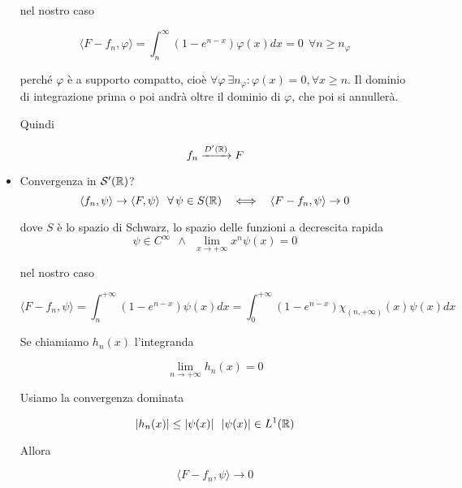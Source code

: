 \begin{itemize}
nel nostro caso

\begin{equation*}
\langle F - f_{n}, \varphi \rangle = \int^{\infty}_{n}\left(1 - e^{n - x}\right) \varphi (x)dx = 0\ \ \forall n \geq n_{\varphi}
\end{equation*}

perché $\varphi $ è a supporto compatto, cioè $\forall \varphi \ \exists n_{\varphi} :\varphi (x) = 0, \forall x \geq n$. Il dominio di integrazione prima o poi andrà oltre il dominio di $\varphi $, che poi si annullerà.

Quindi

\begin{equation*}
f_{n}\xrightarrow{D'(\mathbb{R})} F
\end{equation*}
\item Convergenza in $\mathcal{S}  '(\mathbb{R})$?
\begin{equation*}
\langle f_{n}, \psi \rangle \rightarrow \langle F, \psi \rangle \ \ \forall \psi \in S(\RR) \ \ \iff \ \ \langle F - f_{n}, \psi \rangle \rightarrow 0
\end{equation*}

dove $S$ è lo spazio di Schwarz, lo spazio delle funzioni a decrescita rapida
\begin{equation*}
\psi \in C^{\infty} \ \ \land \ \ \lim\limits_{x\rightarrow + \infty} x^{n} \psi (x) = 0
\end{equation*}

nel nostro caso

\begin{equation*}
\langle F - f_{n}, \psi \rangle = \int^{+ \infty}_{n}\left(1 - e^{n - x}\right) \psi (x) dx = \int^{+ \infty}_{0}\left(1 - e^{n - x}\right) \chi_{(n, + \infty)}(x) \psi (x) dx
\end{equation*}

Se chiamiamo $h_{n}(x)$ l'integranda

\begin{equation*}
\lim\limits_{n\rightarrow + \infty} h_{n}(x) = 0
\end{equation*}

Usiamo la convergenza dominata

\begin{equation*}
| h_{n}(x)| \leq | \psi (x)| \ \ | \psi (x)| \in L^{1}(\mathbb{R})
\end{equation*}

Allora

\begin{equation*}
\langle F - f_{n}, \psi \rangle \rightarrow 0
\end{equation*}
\end{itemize}
